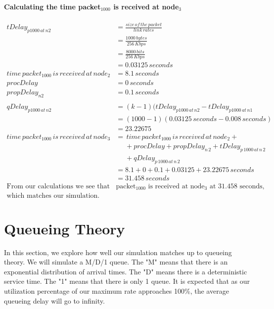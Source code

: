 \documentclass[fleqn,11pt]{article}
\begin{document}
\paragraph{Calculating the time packet$_{1000}$ is received at node$_3$ }
\begin{align*}
tDelay_{p1000\,at\,n2} &=  \frac{size\,of\,the\,packet} {link\,rates}\\
&= \frac{1000\,bytes} {256\,Kbps}\\
&=  \frac{8000\,bits} {256\,Kbps}\\
&= 0.03125 \,seconds\\
time\,packet_{1000}\,is\,received\,at\,node_{2} &= 8.1\,seconds\\
procDelay &= 0\,seconds\\
propDelay_{n2} &= 0.1\,seconds\\
\\
qDelay_{p1000\,at\,n2} &= (k - 1) (tDelay_{p1000\,at\,n2} - tDelay_{p1000\,at\,n1}\\
&=(1000 - 1) (0.03125\,seconds - 0.008\,seconds)\\
&=23.22675 \\
time\,packet_{1000}\,is\,received\,at\,node_{3} &= \,time\,packet_{1000}\,is\,received\,at\,node_{2} + \\
&\,\,\,\,\,\,\,\, + procDelay + propDelay_{n\,2} + tDelay_{p\,1000\,at\,n\,2} \\
&\,\,\,\,\,\,\,\, + qDelay_{p\,1000\,at\,n\,2}\\
&= 8.1 + 0 + 0.1 + 0.03125 + 23.22675\,seconds\\
&= 31.458\,seconds \\
\text{From our calculations we see that }
&\text{packet$_{1000}$ is received at node$_3$ at 31.458 seconds,} \\
\text{which matches our simulation.}
\end{align*}

\section{Queueing Theory}
In this section, we explore how well our simulation matches up to queueing theory. We will simulate a M/D/1 queue. The "M" means that there is an exponential distribution of arrival times. The "D" means there is a deterministic service time. The "1" means that there is only 1 queue. It is expected that as our utilization percentage of our maximum rate approaches 100\%, the average queueing delay will go to infinity.
\end{document}
